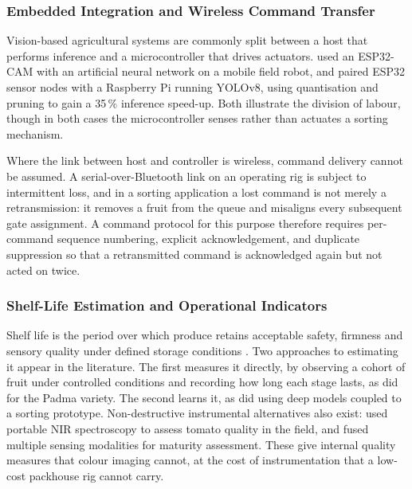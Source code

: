 \subsubsection{Embedded Integration and Wireless Command Transfer}
\label{sec:embedded}

Vision-based agricultural systems are commonly split between a host that performs inference and a microcontroller that drives actuators. \citet{patria2025} used an ESP32-CAM with an artificial neural network on a mobile field robot, and \citet{saxena2025} paired ESP32 sensor nodes with a Raspberry Pi running YOLOv8, using quantisation and pruning to gain a 35\,\% inference speed-up. Both illustrate the division of labour, though in both cases the microcontroller senses rather than actuates a sorting mechanism.

Where the link between host and controller is wireless, command delivery cannot be assumed. A serial-over-Bluetooth link on an operating rig is subject to intermittent loss, and in a sorting application a lost command is not merely a retransmission: it removes a fruit from the queue and misaligns every subsequent gate assignment. A command protocol for this purpose therefore requires per-command sequence numbering, explicit acknowledgement, and duplicate suppression so that a retransmitted command is acknowledged again but not acted on twice.

\subsubsection{Shelf-Life Estimation and Operational Indicators}
\label{sec:shelflife_lit}

Shelf life is the period over which produce retains acceptable safety, firmness and sensory quality under defined storage conditions \citep{tarlak2023}. Two approaches to estimating it appear in the literature. The first measures it directly, by observing a cohort of fruit under controlled conditions and recording how long each stage lasts, as \citet{abekoon2024} did for the Padma variety. The second learns it, as \citet{geetha2025} did using deep models coupled to a sorting prototype. Non-destructive instrumental alternatives also exist: \citet{borba2021} used portable \acrfull{NIR} spectroscopy to assess tomato quality in the field, and \citet{liu2024} fused multiple sensing modalities for maturity assessment. These give internal quality measures that colour imaging cannot, at the cost of instrumentation that a low-cost packhouse rig cannot carry.

